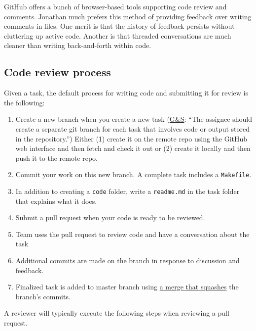 GitHub offers a bunch of browser-based tools supporting code review and comments.
Jonathan much prefers this method of providing feedback over writing comments in files.
One merit is that the history of feedback persists without cluttering up active code.
Another is that threaded conversations are much cleaner than writing back-and-forth within code.

\subsection{Code review process}\label{code_review_process}
Given a task, the default process for writing code and submitting it for review is the following:
\begin{enumerate}
\item Create a new branch when you create a new task 
(\href{https://github.com/gslab-econ/ra-manual/wiki/Tasks}{G\&S}: ``The assignee should create a separate git branch for each task that involves code or output stored in the repository.'')
Either (1) create it on the remote repo using the GitHub web interface and then fetch and check it out or (2) create it locally and then push it to the remote repo.
\item Commit your work on this new branch. A complete task includes a \texttt{Makefile}.
\item In addition to creating a \texttt{code} folder, write a \texttt{readme.md} in the task folder that explains what it does.
\item Submit a pull request when your code is ready to be reviewed.
\item Team uses the pull request to review code and have a conversation about the task
\item Additional commits are made on the branch in response to discussion and feedback.
\item Finalized task is added to master branch using \href{https://docs.github.com/en/pull-requests/collaborating-with-pull-requests/incorporating-changes-from-a-pull-request/about-pull-request-merges#squash-and-merge-your-commits}{a merge that squashes} the branch's commits.
\end{enumerate}

A reviewer will typically execute the following steps when reviewing a pull request.

